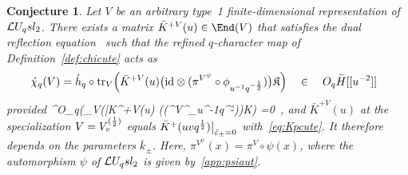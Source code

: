 \documentclass[11pt]{amsart}
\numberwithin{equation}{section}
\newtheorem{conj}[thm]{Conjecture}
\numberwithin{equation}{section}
\begin{document}
       \begin{conj}\label{conj:chiunivK}
          Let $V$ be an arbitrary type~1 finite-dimensional representation of $\mathcal{L} U_q sl_2$. There exists a matrix 
          $\bar K^{+V}(u)\in \End(V)$   that satisfies the dual reflection equation~\cite[Eq.\,(13)]{Skly88} such that  the refined $q$-character map of Definition~\ref{def:chicute} acts as
        \begin{equation}
		  	\acute{\chi}_q(V) =  \acute{h}_q \circ
    \normalfont{\text{tr}}_{V}\Big(\bar K^{+V}(u)
		  		\big(\id \otimes (\pi^{V^\psi}\circ \phi_{u^{-1}q^{-\h}})\big){\mathfrak K}
		  		\Big)  \quad \in \quad O_q\widetilde{H}[[u^{-2}]] \ 
		  	\ \label{tguniv} 
		  \end{equation}
	provided
      \beqa
\deg^{O_q}\Bigr(_{V}\bigl(\bar K^{+V}(u)
		  		\big(\id \otimes (\pi^{V^\psi}\circ \phi_{u^{-1}q^{-\h}})\big){\mathfrak K}\Bigl) =0\ ,
      \eeqa
  and  $\bar K^{+V}(u)$ at the specialization $V=V^{(\frac{1}{2})}_v$  equals $\bar K^{+}(uvq^{\frac{1}{2}})\big|_{\bar\varepsilon_\pm=0}$ with~\eqref{eq:Kpcute}. It therefore depends on the parameters $\bar{k}_\pm$.
  Here, $\pi^{V^\psi}(x) =\pi^{V}\circ \psi(x)$, where the automorphism $\psi$ of $\mathcal{L} U_q sl_2$ is given by~\eqref{app:psiaut}. 
          \end{conj}
\end{document}

